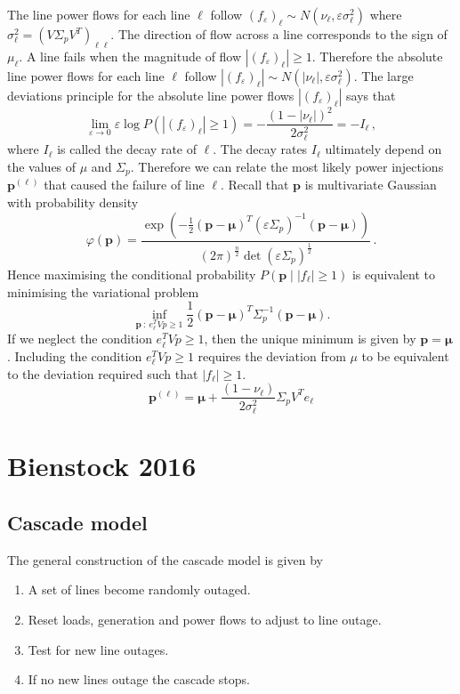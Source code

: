 \documentclass{article}
\newcommand{\e}{\varepsilon}
\renewcommand{\l}{\ell}
\begin{document}
The line power flows for each line $\l$ follow $(f_\e)_\l\sim N(\nu_\l, \e \sigma_\l^2)$ where $\sigma_\l^2 = \left(V\Sigma_p V^T\right)_{\l\l}$. The direction of flow across a line corresponds to the sign of $\mu_\l$. A line fails when the magnitude of flow $|(f_\e)_\l|\ge 1$. Therefore the absolute line power flows for each line $\l$ follow $|(f_\e)_\l |\sim N(|\nu_\l |, \e \sigma_\l^2)$. The large deviations principle for the absolute line power flows $|(f_\e)_\l|$ says that
\[\lim_{\e\to 0} \e \log P(|(f_\e)_\l|\ge 1) =-\frac{(1-|\nu_\l| )^2}{2\sigma_\l^2} = -I_\l \,,\]
where $I_\l$ is called the decay rate of $\l$. The decay rates $I_\l$ ultimately depend on the values of $\mu$ and $\Sigma_p$. Therefore we can relate the most likely power injections $\bm p^{(\l)}$ that caused the failure of line $\l$. Recall that $\bm p$ is multivariate Gaussian with probability density 
\[\varphi(\bm p) = \frac{\exp(-\frac{1}{2}(\bm p - \bm \mu)^T(\e\Sigma_p)^{-1}(\bm p-\bm \mu))}{(2\pi)^{\frac{n}{2}}\det(\e\Sigma_p)^{\frac{1}{2}}} \,.\]
Hence maximising the conditional probability $P(\bm p\mid |f_\l|\ge 1)$ is equivalent to minimising the variational problem
\[\inf_{\bm p\ :\ e_\l^TVp\ge 1} \frac{1}{2}(\bm p - \bm \mu)^T\Sigma_p^{-1}(\bm p-\bm \mu).\]
If we neglect the condition $e_\l^TVp\ge 1$, then the unique minimum is given by $\bm p = \bm \mu$. Including the condition $e_\l^TVp\ge 1$ requires the deviation from $\mu$ to be equivalent to the deviation required such that $|f_\l|\ge 1$. 
\[\bm p^{(\l)} = \bm \mu + \frac{(1-\nu_\l)}{2\sigma_\l^2}\Sigma_p V^T e_\l\]


\section{Bienstock 2016}

\subsection{Cascade model}

The general construction of the cascade model is given by
\begin{enumerate}
\item A set of lines become randomly outaged.
\item Reset loads, generation and power flows to adjust to line outage.
\item Test for new line outages.
\item If no new lines outage the cascade stops.
\end{enumerate}
\end{document}

